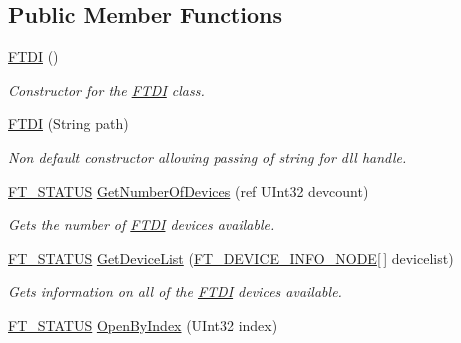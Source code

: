 \subsection*{Public Member Functions}
\begin{DoxyCompactItemize}
\item 
\mbox{\hyperlink{class_f_t_d2_x_x___n_e_t_1_1_f_t_d_i_a227eed3678fb2faa42d9825a611c664a}{F\+T\+DI}} ()
\begin{DoxyCompactList}\small\item\em Constructor for the \mbox{\hyperlink{class_f_t_d2_x_x___n_e_t_1_1_f_t_d_i}{F\+T\+DI}} class. \end{DoxyCompactList}\item 
\mbox{\hyperlink{class_f_t_d2_x_x___n_e_t_1_1_f_t_d_i_aacdcc95380200eaf2475fcf8661797dc}{F\+T\+DI}} (String path)
\begin{DoxyCompactList}\small\item\em Non default constructor allowing passing of string for dll handle. \end{DoxyCompactList}\item 
\mbox{\hyperlink{class_f_t_d2_x_x___n_e_t_1_1_f_t_d_i_aabe20ad905cc4ccc1e35dd5b877d9a83}{F\+T\+\_\+\+S\+T\+A\+T\+US}} \mbox{\hyperlink{class_f_t_d2_x_x___n_e_t_1_1_f_t_d_i_a6678e4b06be462ec26ff78b57f9cbdab}{Get\+Number\+Of\+Devices}} (ref U\+Int32 devcount)
\begin{DoxyCompactList}\small\item\em Gets the number of \mbox{\hyperlink{class_f_t_d2_x_x___n_e_t_1_1_f_t_d_i}{F\+T\+DI}} devices available. \end{DoxyCompactList}\item 
\mbox{\hyperlink{class_f_t_d2_x_x___n_e_t_1_1_f_t_d_i_aabe20ad905cc4ccc1e35dd5b877d9a83}{F\+T\+\_\+\+S\+T\+A\+T\+US}} \mbox{\hyperlink{class_f_t_d2_x_x___n_e_t_1_1_f_t_d_i_a53b4964fa4eb85d4d36e4f962a65cccb}{Get\+Device\+List}} (\mbox{\hyperlink{class_f_t_d2_x_x___n_e_t_1_1_f_t_d_i_1_1_f_t___d_e_v_i_c_e___i_n_f_o___n_o_d_e}{F\+T\+\_\+\+D\+E\+V\+I\+C\+E\+\_\+\+I\+N\+F\+O\+\_\+\+N\+O\+DE}}\mbox{[}$\,$\mbox{]} devicelist)
\begin{DoxyCompactList}\small\item\em Gets information on all of the \mbox{\hyperlink{class_f_t_d2_x_x___n_e_t_1_1_f_t_d_i}{F\+T\+DI}} devices available. \end{DoxyCompactList}\item 
\mbox{\hyperlink{class_f_t_d2_x_x___n_e_t_1_1_f_t_d_i_aabe20ad905cc4ccc1e35dd5b877d9a83}{F\+T\+\_\+\+S\+T\+A\+T\+US}} \mbox{\hyperlink{class_f_t_d2_x_x___n_e_t_1_1_f_t_d_i_a5327412a6aa103c747e9d47b02f3649c}{Open\+By\+Index}} (U\+Int32 index)

\end{DoxyCompactItemize}
